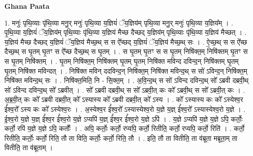 \documentclass[17pt]{extarticle}
\begin{document}
\textbf{Ghana Paata } \newline

1. मनुः॑ पृथि॒व्याः पृ॑थि॒व्या मनु॒र् मनुः॑ पृथि॒व्या य॒ज्ञियं॑ ॅय॒ज्ञिय॑म् पृथि॒व्या मनु॒र् मनुः॑ पृथि॒व्या य॒ज्ञिय᳚म् । . पृ॒थि॒व्या य॒ज्ञियं॑ ॅय॒ज्ञिय॑म् पृथि॒व्याः पृ॑थि॒व्या य॒ज्ञिय॑ मैच्छ दैच्छद् य॒ज्ञिय॑म् पृथि॒व्याः पृ॑थि॒व्या य॒ज्ञिय॑ मैच्छत् । . य॒ज्ञिय॑ मैच्छ दैच्छद् य॒ज्ञियं॑ ॅय॒ज्ञिय॑ मैच्छ॒थ् स स ऐ᳚च्छद् य॒ज्ञियं॑ ॅय॒ज्ञिय॑ मैच्छ॒थ् सः । . ऐ॒च्छ॒थ् स स ऐ᳚च्छ दैच्छ॒थ् स घृ॒तम् घृ॒तꣳ स ऐ᳚च्छ दैच्छ॒थ् स घृ॒तम् । . स घृ॒तम् घृ॒तꣳ स स घृ॒तम् निषि॑क्त॒म् निषि॑क्तम् घृ॒तꣳ स स घृ॒तम् निषि॑क्तम् । . घृ॒तम् निषि॑क्त॒म् निषि॑क्तम् घृ॒तम् घृ॒तम् निषि॑क्त मविन्द दविन्द॒न् निषि॑क्तम् घृ॒तम् घृ॒तम् निषि॑क्त मविन्दत् । . निषि॑क्त मविन् ददविन्द॒न् निषि॑क्त॒म् निषि॑क्त मविन्द॒थ् स सो॑ ऽविन्द॒न् निषि॑क्त॒म् निषि॑क्त मविन्द॒थ् सः । . निषि॑क्त॒मिति॒ नि - सि॒क्त॒म् । . अ॒वि॒न्द॒थ् स सो॑ ऽविन्द दविन्द॒थ् सो᳚ ऽब्रवी दब्रवी॒थ् सो॑ ऽविन्द दविन्द॒थ् सो᳚ ऽब्रवीत् । . सो᳚ ऽब्रवी दब्रवी॒थ् स सो᳚ ऽब्रवी॒त् कः को᳚ ऽब्रवी॒थ् स सो᳚ ऽब्रवी॒त् कः । . अ॒ब्र॒वी॒त् कः को᳚ ऽब्रवी दब्रवी॒त् को᳚ ऽस्यास्य को᳚ ऽब्रवी दब्रवी॒त् को᳚ ऽस्य । . को᳚ ऽस्यास्य कः को᳚ ऽस्येश्व॒र ई᳚श्व॒रो᳚ ऽस्य कः को᳚ ऽस्येश्व॒रः । . अ॒स्येश्व॒र ई᳚श्व॒रो᳚ ऽस्यास्येश्व॒रो य॒ज्ञे य॒ज्ञ् ई᳚श्व॒रो᳚ ऽस्यास्येश्व॒रो य॒ज्ञे । . ई॒श्व॒रो य॒ज्ञे य॒ज्ञ् ई᳚श्व॒र ई᳚श्व॒रो य॒ज्ञे ऽप्यपि॑ य॒ज्ञ् ई᳚श्व॒र ई᳚श्व॒रो य॒ज्ञे ऽपि॑ । . य॒ज्ञे ऽप्यपि॑ य॒ज्ञे य॒ज्ञे ऽपि॒ कर्तोः॒ कर्तो॒ रपि॑ य॒ज्ञे य॒ज्ञे ऽपि॒ कर्तोः᳚ । . अपि॒ कर्तोः॒ कर्तो॒ रप्यपि॒ कर्तो॒ रितीति॒ कर्तो॒ रप्यपि॒ कर्तो॒ रिति॑ । . कर्तो॒ रितीति॒ कर्तोः॒ कर्तो॒ रिति॒ तौ ता विति॒ कर्तोः॒ कर्तो॒ रिति॒ तौ । . इति॒ तौ ता वितीति॒ ता व॑ब्रूता मब्रूता॒म् ता वितीति॒ ता व॑ब्रूताम् । \newline
\end{document}
